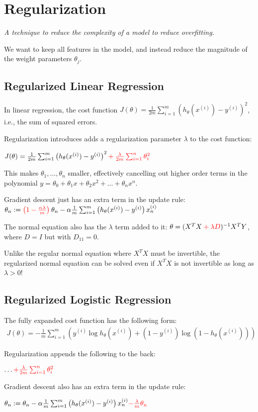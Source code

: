\section{Regularization}
\emph{A technique to reduce the complexity of a model to reduce overfitting.}

We want to keep all features in the model, and instead reduce the magnitude of the weight parameters
$\theta_j$.

\subsection{Regularized Linear Regression}
In linear regression, the cost function 
$J(\theta) = \frac{1}{2m} \sum_{i=1}^{m} \left(h_\theta(x^{(i)}) - y^{(i)}\right)^2$,
i.e., the sum of squared errors.

Regularization introduces adds a regularization parameter $\lambda$ to the cost function:

$J(\theta) = \frac{1}{2m} \sum_{i=1}^{m} \left(h_\theta(x^{(i)}) - y^{(i)}\right)^2 
\color{red} {+ \: \frac{\lambda}{2m} \sum_{i=1}^{n} \theta_i^2}$

This makes $\theta_1, \dots, \theta_n$ smaller, effectively cancelling out higher order terms in
the polynomial $y = \theta_0 + \theta_1 x + \theta_2 x^2 + \dots + \theta_n x^n$.

Gradient descent just has an extra term in the update rule:
$\theta_n := \textcolor{red}{\left( 1 - \frac{\alpha\lambda}{m}  \right)} \: \theta_n 
- \alpha \frac{1}{m} \sum_{i=1}^{m} \left( h_\theta(x^{(i)}) - y^{(i)} \right) x_n^{(i)}$

The normal equation also has the $\lambda$ term added to it:
$\theta = (X^TX \textcolor{red}{\:+\:\lambda D})^{-1} X^TY$, where $D = I$ but with $D_{11} = 0$.

Unlike the regular normal equation where $X^TX$ must be invertible,
the regularized normal equation can be solved even if $X^TX$ is not invertible
as long as $\lambda > 0$!

\subsection{Regularized Logistic Regression}
The fully expanded cost function has the following form:\\[-0.2em]
\begin{align*}
    J(\theta) = 
    -\frac{1}{m} \sum_{i=1}^{m} \left(
        y^{(i)} \log h_\theta(x^{(i)}) +
        (1 - y^{(i)}) \log\left(1 - h_\theta(x^{(i)}) \right)
    \right)
\end{align*}

Regularization appends the following to the back:

$\dots \textcolor{red}{+ \frac{\lambda}{2m} \sum_{i=1}^{n} \theta_i^2}$

Gradient descent also has an extra term in the update rule:

$\theta_n := \theta_n - \alpha \frac{1}{m} \sum_{i=1}^{m} 
    \left( h_\theta(x^{(i)}) - y^{(i)} \right) x_n^{(i)}
    \textcolor{red}{- \frac{\lambda}{m} \theta_n}$